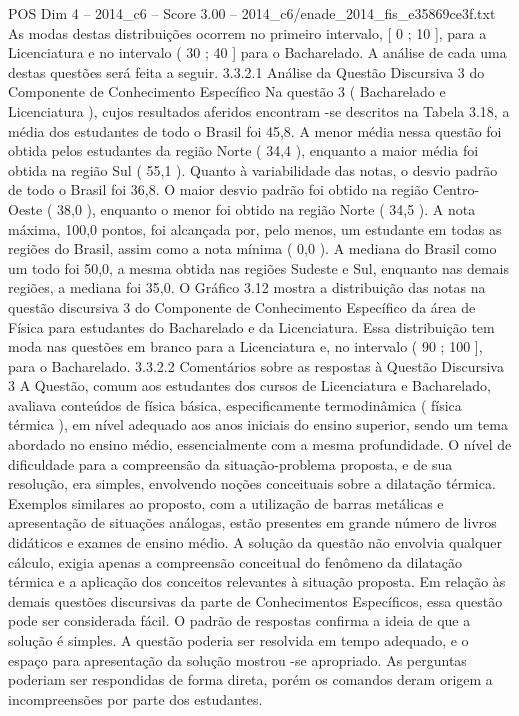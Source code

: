 \begin{textsample}{POS Dim 4 – 2014\_c6 – Score 3.00 – 2014\_c6/enade\_2014\_fis\_e35869ce3f.txt}
As modas destas distribuições ocorrem no primeiro intervalo, [ 0 ; 10 ], para a Licenciatura e no intervalo ( 30 ; 40 ] para o Bacharelado.
A análise de cada uma destas questões será feita a seguir. 3.3.2.1 Análise da Questão Discursiva 3 do Componente de Conhecimento Específico Na questão 3 ( Bacharelado e Licenciatura ), cujos resultados aferidos encontram -se descritos na Tabela 3.18, a média dos estudantes de todo o Brasil foi 45,8.
A menor média nessa questão foi obtida pelos estudantes da região Norte ( 34,4 ), enquanto a maior média foi obtida na região Sul ( 55,1 ).
Quanto à variabilidade das notas, o desvio padrão de todo o Brasil foi 36,8.
O maior desvio padrão foi obtido na região Centro-Oeste ( 38,0 ), enquanto o menor foi obtido na região Norte ( 34,5 ).
A nota máxima, 100,0 pontos, foi alcançada por, pelo menos, um estudante em todas as regiões do Brasil, assim como a nota mínima ( 0,0 ).
A mediana do Brasil como um todo foi 50,0, a mesma obtida nas regiões Sudeste e Sul, enquanto nas demais regiões, a mediana foi 35,0.
O Gráfico 3.12 mostra a distribuição das notas na questão discursiva 3 do Componente de Conhecimento Específico da área de Física para estudantes do Bacharelado e da Licenciatura.
Essa distribuição tem moda nas questões em branco para a Licenciatura e, no intervalo ( 90 ; 100 ], para o Bacharelado. 3.3.2.2 Comentários sobre as respostas à Questão Discursiva 3 A Questão, comum aos estudantes dos cursos de Licenciatura e Bacharelado, avaliava conteúdos de física básica, especificamente termodinâmica ( física térmica ), em nível adequado aos anos iniciais do ensino superior, sendo um tema abordado no ensino médio, essencialmente com a mesma profundidade.
O nível de dificuldade para a compreensão da situação-problema proposta, e de sua resolução, era simples, envolvendo noções conceituais sobre a dilatação térmica.
Exemplos similares ao proposto, com a utilização de barras metálicas e apresentação de situações análogas, estão presentes em grande número de livros didáticos e exames de ensino médio.
A solução da questão não envolvia qualquer cálculo, exigia apenas a compreensão conceitual do fenômeno da dilatação térmica e a aplicação dos conceitos relevantes à situação proposta.
Em relação às demais questões discursivas da parte de Conhecimentos Específicos, essa questão pode ser considerada fácil.
O padrão de respostas confirma a ideia de que a solução é simples.
A questão poderia ser resolvida em tempo adequado, e o espaço para apresentação da solução mostrou -se apropriado.
As perguntas poderiam ser respondidas de forma direta, porém os comandos deram origem a incompreensões por parte dos estudantes.

\end{textsample}
